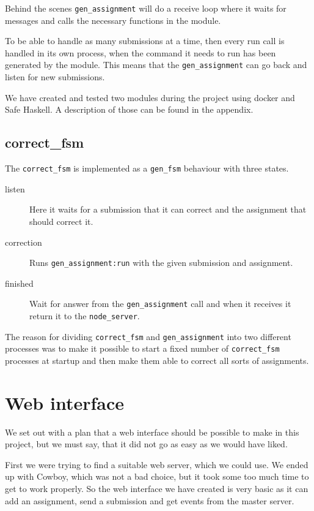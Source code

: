 Behind the scenes \texttt{gen\_assignment} will do a receive loop where it waits
for messages and calls the necessary functions in the module.

To be able to handle as many submissions at a time, then every run call is
handled in its own process, when the command it needs to run has been generated
by the module. This means that the \texttt{gen\_assignment} can go back and
listen for new submissions.

We have created and tested two modules during the project using docker and Safe
Haskell. A description of those can be found in the appendix.

\subsection{correct\_fsm}
The \texttt{correct\_fsm} is implemented as a \texttt{gen\_fsm} behaviour with
three states.
\begin{description}
    \item[listen] Here it waits for a submission that it can correct and the
    assignment that should correct it.
    \item[correction] Runs \texttt{gen\_assignment:run} with the given
    submission and assignment.
    \item[finished] Wait for answer from the \texttt{gen\_assignment} call and
    when it receives it return it to the \texttt{node\_server}.
\end{description}

The reason for dividing \texttt{correct\_fsm} and \texttt{gen\_assignment} into
two different processes was to make it possible to start a fixed number of
\texttt{correct\_fsm} processes at startup and then make them able to correct
all sorts of assignments.

\section{Web interface}
We set out with a plan that a web interface should be possible to make in this
project, but we must say, that it did not go as easy as we would have liked.

First we were trying to find a suitable web server, which we could use. We ended
up with Cowboy, which was not a bad choice, but it took some too much time to
get to work properly. So the web interface we have created is very basic as it
can add an assignment, send a submission and get events from the master server.

